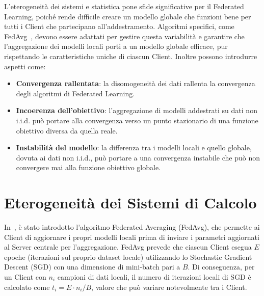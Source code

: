 \documentclass[a4paper, oneside, openright]{report}
\let\oldsection\section
\renewcommand{\section}{\newpage\oldsection}
\begin{document}
L'eterogeneità dei sistemi e statistica pone sfide significative per il Federated Learning, poiché rende difficile creare un modello globale che funzioni bene per tutti i Client che partecipano all'addestramento. Algoritmi specifici, come FedAvg~\cite{DBLP:journals/corr/McMahanMRA16}, devono essere adattati per gestire questa variabilità e garantire che l'aggregazione dei modelli locali porti a un modello globale efficace, pur rispettando le caratteristiche uniche di ciascun Client. Inoltre possono introdurre aspetti come: 
\begin{itemize}
    \item  \textbf{Convergenza rallentata}:
    la disomogeneità dei dati rallenta la convergenza degli algoritmi di Federated Learning. \cite{li2020convergencefedavgnoniiddata}

    \item \textbf{Incoerenza dell'obiettivo}: l'aggregazione di modelli addestrati su dati non i.i.d. può portare alla convergenza verso un punto stazionario di una funzione obiettivo diversa da quella reale. \cite{DBLP:journals/corr/abs-2007-07481}
    
    \item \textbf{Instabilità del modello}: la differenza tra i modelli locali e quello globale, dovuta ai dati non i.i.d., può portare a una convergenza instabile che può non convergere mai alla funzione obiettivo globale. \cite{DBLP:journals/corr/abs-1910-06378}
\end{itemize}


\section{Eterogeneità dei Sistemi di Calcolo}\label{chap:sys-eter}

In~\cite{DBLP:journals/corr/McMahanMRA16}, è stato introdotto l'algoritmo Federated Averaging (FedAvg), che permette ai Client di aggiornare i propri modelli locali prima di inviare i parametri aggiornati al Server centrale per l'aggregazione. FedAvg prevede che ciascun Client esegua $E$ epoche (iterazioni sul proprio dataset locale) utilizzando lo Stochastic Gradient Descent (SGD) \cite{10.1214/aoms/1177729586} con una dimensione di mini-batch pari a $B$. Di conseguenza, per un Client con $n_i$ campioni di dati locali, il numero di iterazioni locali di SGD è calcolato come $t_i = E \cdot n_i / B$, valore che può variare notevolmente tra i Client.
\end{document}
